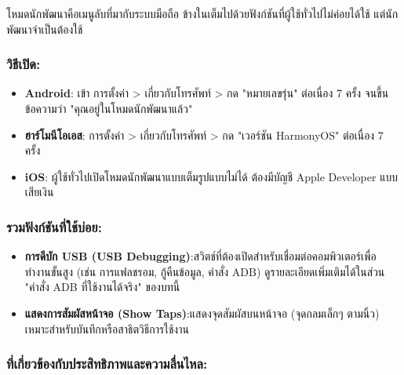 


โหมดนักพัฒนาคือเมนูลับที่มากับระบบมือถือ ข้างในเต็มไปด้วยฟังก์ชันที่ผู้ใช้ทั่วไปไม่ค่อยได้ใช้ แต่นักพัฒนาจำเป็นต้องใช้

\subsubsection*{วิธีเปิด:}

\begin{itemize}
  \item \textbf{Android}: เข้า การตั้งค่า > เกี่ยวกับโทรศัพท์ > กด "หมายเลขรุ่น" ต่อเนื่อง 7 ครั้ง จนขึ้นข้อความว่า "คุณอยู่ในโหมดนักพัฒนาแล้ว"
  \item \textbf{ฮาร์โมนีโอเอส}: การตั้งค่า > เกี่ยวกับโทรศัพท์ > กด "เวอร์ชัน HarmonyOS" ต่อเนื่อง 7 ครั้ง
  \item \textbf{iOS}: ผู้ใช้ทั่วไปเปิดโหมดนักพัฒนาแบบเต็มรูปแบบไม่ได้ ต้องมีบัญชี Apple Developer แบบเสียเงิน
\end{itemize}

\subsubsection*{รวมฟังก์ชันที่ใช้บ่อย:}

\begin{itemize}
  \item \textbf{การดีบัก USB (USB Debugging)}:สวิตช์ที่ต้องเปิดสำหรับเชื่อมต่อคอมพิวเตอร์เพื่อทำงานขั้นสูง (เช่น การแฟลชรอม, กู้คืนข้อมูล, คำสั่ง ADB) ดูรายละเอียดเพิ่มเติมได้ในส่วน "คำสั่ง ADB ที่ใช้งานได้จริง" ของบทนี้
  \item \textbf{แสดงการสัมผัสหน้าจอ (Show Taps)}:แสดงจุดสัมผัสบนหน้าจอ (จุดกลมเล็กๆ ตามนิ้ว) เหมาะสำหรับบันทึกหรือสาธิตวิธีการใช้งาน
\end{itemize}

\subsubsection*{ที่เกี่ยวข้องกับประสิทธิภาพและความลื่นไหล:}

